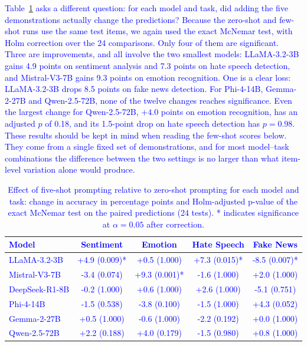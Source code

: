\documentclass[10pt,letterpaper]{article}
\newcommand{\rev}[1]{\textcolor{blue}{#1}}
\begin{document}
\rev{Table~\ref{tab:fewshot_effect} asks a different question: for each model and task, did adding the five demonstrations actually change the predictions? Because the zero-shot and few-shot runs use the same test items, we again used the exact McNemar test, with Holm correction over the 24 comparisons. Only four of them are significant. Three are improvements, and all involve the two smallest models: LLaMA-3.2-3B gains 4.9 points on sentiment analysis and 7.3 points on hate speech detection, and Mistral-V3-7B gains 9.3 points on emotion recognition. One is a clear loss: LLaMA-3.2-3B drops 8.5 points on fake news detection. For Phi-4-14B, Gemma-2-27B and Qwen-2.5-72B, none of the twelve changes reaches significance. Even the largest change for Qwen-2.5-72B, $+4.0$ points on emotion recognition, has an adjusted $p$ of 0.18, and its 1.5-point drop on hate speech detection has $p = 0.98$. These results should be kept in mind when reading the few-shot scores below. They come from a single fixed set of demonstrations, and for most model--task combinations the difference between the two settings is no larger than what item-level variation alone would produce.}

\begin{table}[!t]
\centering
\small
\caption{\rev{Effect of five-shot prompting relative to zero-shot prompting for each model and task: change in accuracy in percentage points and Holm-adjusted p-value of the exact McNemar test on the paired predictions (24 tests). * indicates significance at $\alpha = 0.05$ after correction.}}
\label{tab:fewshot_effect}
\renewcommand{\arraystretch}{1.1}
\setlength{\tabcolsep}{4pt}
\begin{tabular}{|l|c|c|c|c|}
\hline
\rev{\textbf{Model}} & \rev{\textbf{Sentiment}} & \rev{\textbf{Emotion}} & \rev{\textbf{Hate Speech}} & \rev{\textbf{Fake News}} \\ \hline
\rev{LLaMA-3.2-3B} & \rev{+4.9 (0.009)*} & \rev{+0.5 (1.000)} & \rev{+7.3 (0.015)*} & \rev{-8.5 (0.007)*} \\ \hline
\rev{Mistral-V3-7B} & \rev{-3.4 (0.074)} & \rev{+9.3 (0.001)*} & \rev{-1.6 (1.000)} & \rev{+2.0 (1.000)} \\ \hline
\rev{DeepSeek-R1-8B} & \rev{-0.2 (1.000)} & \rev{+0.6 (1.000)} & \rev{+2.6 (1.000)} & \rev{-5.1 (0.751)} \\ \hline
\rev{Phi-4-14B} & \rev{-1.5 (0.538)} & \rev{-3.8 (0.100)} & \rev{-1.5 (1.000)} & \rev{+4.3 (0.052)} \\ \hline
\rev{Gemma-2-27B} & \rev{+0.5 (1.000)} & \rev{-0.6 (1.000)} & \rev{-2.2 (0.192)} & \rev{+0.0 (1.000)} \\ \hline
\rev{Qwen-2.5-72B} & \rev{+2.2 (0.188)} & \rev{+4.0 (0.179)} & \rev{-1.5 (0.980)} & \rev{+0.8 (1.000)} \\ \hline
\end{tabular}
\end{table}
\end{document}
